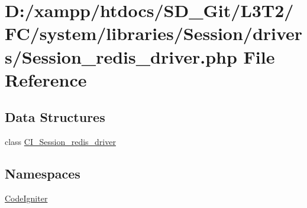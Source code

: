 \hypertarget{_session__redis__driver_8php}{}\section{D\+:/xampp/htdocs/\+S\+D\+\_\+\+Git/\+L3\+T2/\+F\+C/system/libraries/\+Session/drivers/\+Session\+\_\+redis\+\_\+driver.php File Reference}
\label{_session__redis__driver_8php}
\subsection*{Data Structures}
\begin{DoxyCompactItemize}
\item 
class \hyperlink{class_c_i___session__redis__driver}{C\+I\+\_\+\+Session\+\_\+redis\+\_\+driver}
\end{DoxyCompactItemize}
\subsection*{Namespaces}
\begin{DoxyCompactItemize}
\item 
 \hyperlink{namespace_code_igniter}{Code\+Igniter}
\end{DoxyCompactItemize}
